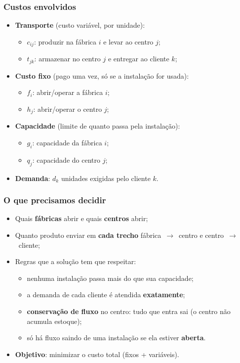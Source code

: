 \documentclass[fleqn]{beamer}
\begin{document}
\begin{frame}
	\frametitle{Custos envolvidos}
	\begin{itemize}
		\item \textbf{Transporte} (custo variável, por unidade):
		\begin{itemize}
			\item $c_{ij}$: produzir na fábrica $i$ e levar ao centro $j$;
			\item $t_{jk}$: armazenar no centro $j$ e entregar ao cliente $k$;
		\end{itemize}
		\item \textbf{Custo fixo} (pago uma vez, só se a instalação for usada):
		\begin{itemize}
			\item $f_i$: abrir/operar a fábrica $i$;
			\item $h_j$: abrir/operar o centro $j$;
		\end{itemize}
		\item \textbf{Capacidade} (limite de quanto passa pela instalação):
		\begin{itemize}
			\item $g_i$: capacidade da fábrica $i$;
			\item $q_j$: capacidade do centro $j$;
		\end{itemize}
		\item \textbf{Demanda}: $d_k$ unidades exigidas pelo cliente $k$.
	\end{itemize}
\end{frame}

\begin{frame}
	\frametitle{O que precisamos decidir}
	\begin{itemize}
		\item Quais \textbf{fábricas} abrir e quais \textbf{centros} abrir;
		\item Quanto produto enviar em \textbf{cada trecho}
			fábrica~$\rightarrow$~centro e centro~$\rightarrow$~cliente;
		\item Regras que a solução tem que respeitar:
		\begin{itemize}
			\item nenhuma instalação passa mais do que sua capacidade;
			\item a demanda de cada cliente é atendida \textbf{exatamente};
			\item \textbf{conservação de fluxo} no centro: tudo que entra
				sai (o centro não acumula estoque);
			\item só há fluxo saindo de uma instalação se ela estiver
				\textbf{aberta}.
		\end{itemize}
		\item \textbf{Objetivo}: minimizar o custo total (fixos + variáveis).
	\end{itemize}
\end{frame}
\end{document}
